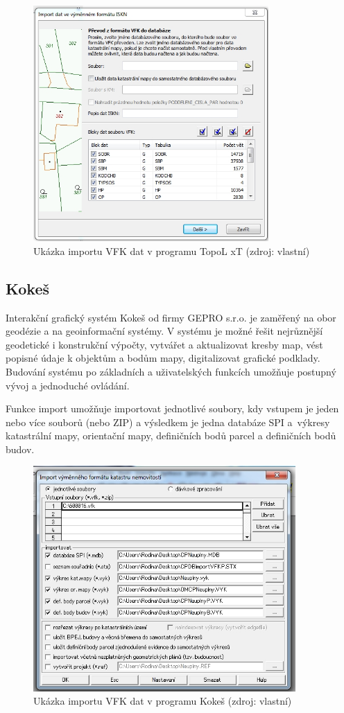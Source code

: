 \begin{figure}[H]
	 \centering
      \includegraphics[height=9cm]{./pictures/topol.png}
      \caption{Ukázka importu VFK dat v programu TopoL xT (zdroj: vlastní)}
      \label{fig:topol}
  \end{figure}
\subsection{Kokeš}
Interakční grafický systém Kokeš od firmy GEPRO s.r.o. je zaměřený na
obor geodézie a na geoinformační systémy. V systému je možné řešit
nejrůznější geodetické i konstrukční výpočty, vytvářet a aktualizovat
kresby map, vést popisné údaje k objektům a bodům mapy, digitalizovat
grafické podklady. Budování systému po základních a uživatelských
funkcích umožňuje postupný vývoj a jednoduché
ovládání. \cite{kokes_cvut}

Funkce import  umožňuje importovat jednotlivé soubory, kdy vstupem je jeden nebo více souborů  (nebo ZIP) a výsledkem je jedna databáze SPI a~výkresy katastrální mapy, orientační mapy, definičních bodů parcel a definičních bodů budov. %

\begin{figure}[H]
	 \centering
      \includegraphics[width=10cm]{./pictures/kokes.png}
      \caption{Ukázka importu VFK dat v programu Kokeš (zdroj: vlastní)}
      \label{fig:kokes}
  \end{figure}
  
